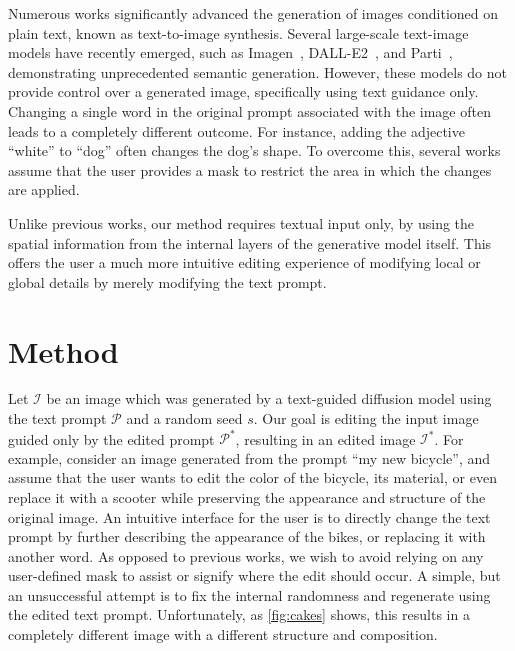 Numerous works \cite{ding2021cogview,hinz2020semantic,tao2020df, li2019controllable,li2019object,qiao2019learn,qiao2019mirrorgan,ramesh2021zero,zhang2018photographic,crowson2022vqgan, gafni2022make, rombach2021highresolution} significantly advanced the generation of images conditioned on plain text, known as text-to-image synthesis. Several large-scale text-image models have recently emerged, such as Imagen~\cite{saharia2022photorealistic}, DALL-E2~\cite{ramesh2022hierarchical}, and Parti~\cite{yu2022scaling}, demonstrating unprecedented semantic generation. However, these models do not provide control over a generated image, specifically using text guidance only. Changing a single word in the original prompt associated with the image often leads to a completely different outcome. For instance, adding the adjective ``white'' to ``dog'' often changes the dog's shape. To overcome this, several works~\cite{nichol2021glide, avrahami2022blendedlatent} assume that the user provides a mask to restrict the area in which the changes are applied. 

Unlike previous works, our method requires textual input only, by using the spatial information from the internal layers of the generative model itself. This offers the user a much more intuitive editing experience of modifying local or global details by merely modifying the text prompt. 

\section{Method}
\label{sec:method}

Let $\mathcal{I}$ be an image which was generated by a text-guided diffusion model \cite{saharia2022photorealistic} using the text prompt $\mathcal{P}$ and a random seed $s$. Our goal is editing the input image guided only by the edited prompt $\mathcal{P}^*$, resulting in an edited image $\mathcal{I}^*$.
For example, consider an image generated from the prompt ``my new bicycle'', and assume that the user wants to edit the color of the bicycle, its material, or even replace it with a scooter while preserving the appearance and structure of the original image. An intuitive interface for the user is to directly change the text prompt by further describing the appearance of the bikes, or replacing it with another word. As opposed to previous works, we wish to avoid relying on any user-defined mask to assist or signify where the edit should occur. A simple, but an unsuccessful attempt is to fix the internal randomness and regenerate using the edited text prompt. Unfortunately, as \ref{fig:cakes} shows, this results in a completely different image with a different structure and composition. 

